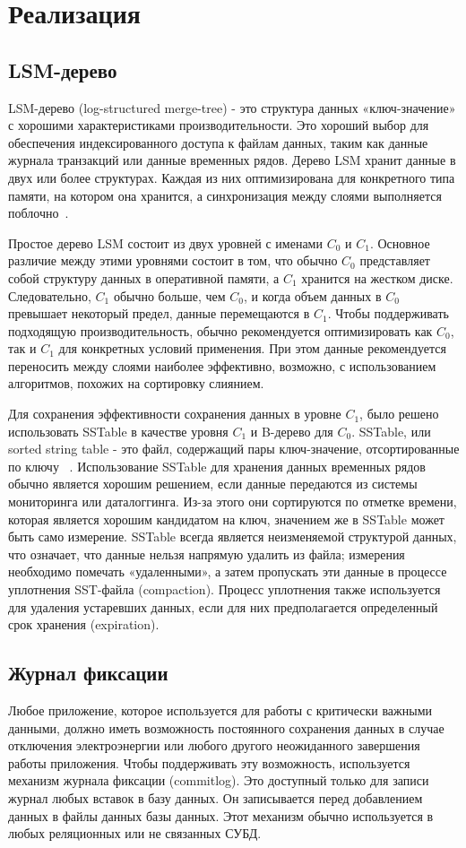\section{Реализация}
\subsection{LSM-дерево}

LSM-дерево (log-structured merge-tree)  - это структура данных «ключ-значение» с хорошими характеристиками производительности. Это хороший выбор для обеспечения индексированного доступа к файлам данных, таким как данные журнала транзакций или данные временных рядов. Дерево LSM хранит данные в двух или более структурах. Каждая из них оптимизирована для конкретного типа памяти, на котором она хранится, а синхронизация между слоями выполняется поблочно~\cite{lsm_tree_orig}.

Простое дерево LSM состоит из двух уровней с именами $C_0$ и $C_1$. Основное различие между этими уровнями состоит в том, что обычно $C_0$ представляет собой структуру данных в оперативной памяти, а $C_1$ хранится на жестком диске. Следовательно, $C_1$ обычно больше, чем $C_0$, и когда объем данных в $C_0$ превышает некоторый предел, данные перемещаются в $C_1$. Чтобы поддерживать подходящую производительность, обычно рекомендуется оптимизировать как $C_0$, так и $C_1$ для конкретных условий применения. При этом данные рекомендуется переносить между слоями наиболее эффективно, возможно, с использованием алгоритмов, похожих на сортировку слиянием.

Для сохранения эффективности сохранения данных в уровне $C_1$, было решено использовать SSTable в качестве уровня $C_1$ и B-дерево для $C_0$. SSTable, или sorted string table - это файл, содержащий пары ключ-значение, отсортированные по ключу ~\cite {sstable}. Использование SSTable для хранения данных временных рядов обычно является хорошим решением, если данные передаются из системы мониторинга или даталоггинга. Из-за этого они сортируются по отметке времени, которая является хорошим кандидатом на ключ, значением же в SSTable может быть само измерение. SSTable всегда является неизменяемой структурой данных, что означает, что данные нельзя напрямую удалить из файла; измерения необходимо помечать «удаленными», а затем пропускать эти данные в процессе уплотнения SST-файла (compaction). Процесс уплотнения также используется для удаления устаревших данных, если для них предполагается определенный срок хранения (expiration).

\subsection{Журнал фиксации}
Любое приложение, которое используется для работы с критически важными данными, должно иметь возможность постоянного сохранения данных в случае отключения электроэнергии или любого другого неожиданного завершения работы приложения. Чтобы поддерживать эту возможность, используется механизм журнала фиксации (commitlog). Это доступный только для записи журнал любых вставок в базу данных. Он записывается перед добавлением данных в файлы данных базы данных. Этот механизм обычно используется в любых реляционных или не связанных СУБД.

